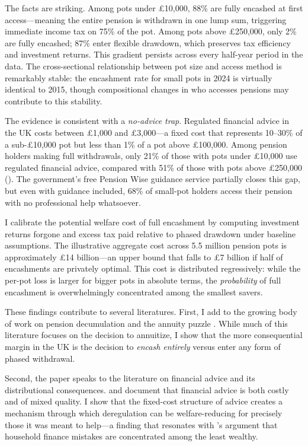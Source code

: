 \documentclass[12pt]{article}
\begin{document}
The facts are striking. Among pots under \pounds10,000, 88\% are fully encashed at first access---meaning the entire pension is withdrawn in one lump sum, triggering immediate income tax on 75\% of the pot. Among pots above \pounds250,000, only 2\% are fully encashed; 87\% enter flexible drawdown, which preserves tax efficiency and investment returns. This gradient persists across every half-year period in the data. The cross-sectional relationship between pot size and access method is remarkably stable: the encashment rate for small pots in 2024 is virtually identical to 2015, though compositional changes in who accesses pensions may contribute to this stability.

The evidence is consistent with a \textit{no-advice trap}. Regulated financial advice in the UK costs between \pounds1,000 and \pounds3,000---a fixed cost that represents 10--30\% of a sub-\pounds10,000 pot but less than 1\% of a pot above \pounds100,000. Among pension holders making full withdrawals, only 21\% of those with pots under \pounds10,000 use regulated financial advice, compared with 51\% of those with pots above \pounds250,000 (). The government's free Pension Wise guidance service partially closes this gap, but even with guidance included, 68\% of small-pot holders access their pension with no professional help whatsoever.

I calibrate the potential welfare cost of full encashment by computing investment returns forgone and excess tax paid relative to phased drawdown under baseline assumptions. The illustrative aggregate cost across 5.5 million pension pots is approximately \pounds14 billion---an upper bound that falls to \pounds7 billion if half of encashments are privately optimal. This cost is distributed regressively: while the per-pot loss is larger for bigger pots in absolute terms, the \textit{probability} of full encashment is overwhelmingly concentrated among the smallest savers.

These findings contribute to several literatures. First, I add to the growing body of work on pension decumulation and the annuity puzzle \citep{yaari1965uncertain, brown2001role, benartzi2011annuitization, beshears2014behavioral}. While much of this literature focuses on the decision to annuitize, I show that the more consequential margin in the UK is the decision to \textit{encash entirely} versus enter any form of phased withdrawal.

Second, the paper speaks to the literature on financial advice and its distributional consequences. \citet{bhattacharya2012costly} and \citet{mullainathan2012market} document that financial advice is both costly and of mixed quality. I show that the fixed-cost structure of advice creates a mechanism through which deregulation can be welfare-reducing for precisely those it was meant to help---a finding that resonates with \citet{campbell2006household}'s argument that household finance mistakes are concentrated among the least wealthy.
\end{document}
